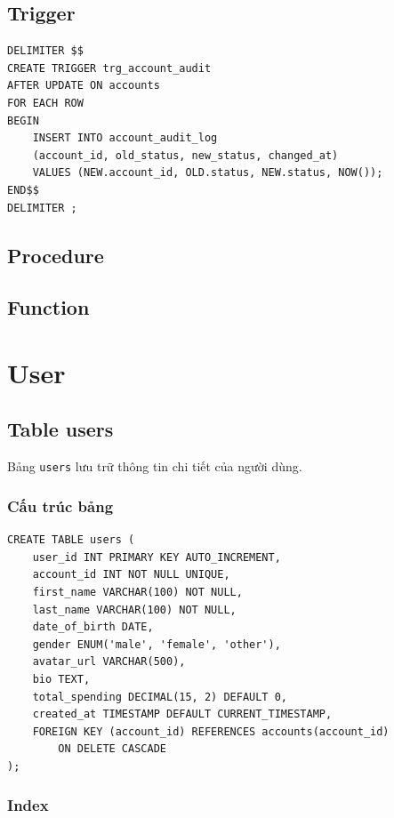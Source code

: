 \subsection{Trigger}

\begin{verbatim}
DELIMITER $$
CREATE TRIGGER trg_account_audit
AFTER UPDATE ON accounts
FOR EACH ROW
BEGIN
    INSERT INTO account_audit_log 
    (account_id, old_status, new_status, changed_at)
    VALUES (NEW.account_id, OLD.status, NEW.status, NOW());
END$$
DELIMITER ;
\end{verbatim}

\subsection{Procedure}

\subsection{Function}

\section{User}

\subsection{Table users}

Bảng \texttt{users} lưu trữ thông tin chi tiết của người dùng.

\subsubsection{Cấu trúc bảng}

\begin{verbatim}
CREATE TABLE users (
    user_id INT PRIMARY KEY AUTO_INCREMENT,
    account_id INT NOT NULL UNIQUE,
    first_name VARCHAR(100) NOT NULL,
    last_name VARCHAR(100) NOT NULL,
    date_of_birth DATE,
    gender ENUM('male', 'female', 'other'),
    avatar_url VARCHAR(500),
    bio TEXT,
    total_spending DECIMAL(15, 2) DEFAULT 0,
    created_at TIMESTAMP DEFAULT CURRENT_TIMESTAMP,
    FOREIGN KEY (account_id) REFERENCES accounts(account_id)
        ON DELETE CASCADE
);
\end{verbatim}

\subsubsection{Index}


